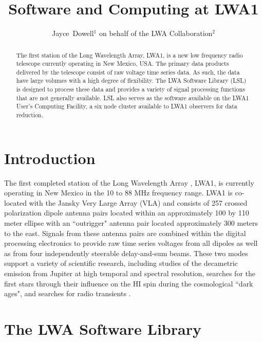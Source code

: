 
\resetcounters




\title{Software and Computing at LWA1}
\author{
Jayce~Dowell$^1$ on behalf of the LWA Collaboration$^2$
}


\begin{abstract}
The first station of the Long Wavelength Array, LWA1, is a new low frequency radio telescope currently operating in New Mexico, USA.  The primary data products delivered by the telescope consist of raw voltage time series data.  As such, the data have large volumes with a high degree of flexibility.  The LWA Software Library (LSL) is designed to process these data and provides a variety of signal processing functions that are not generally available.  LSL also serves as the software available on the LWA1 User's Computing Facility, a six node cluster available to LWA1 observers for data reduction.
\end{abstract}

\section{Introduction}
The first completed station of the Long Wavelength Array \citep[LWA;][]{LWA}, LWA1, is currently operating in New Mexico in the 10 to 88 MHz frequency range.  LWA1 is co-located with the Jansky Very Large Array (VLA) and consists of 257 crossed polarization dipole antenna pairs located within an approximately 100 by 110 meter ellipse with an ``outrigger" antenna pair located approximately 300 meters to the east.  Signals from these antenna pairs are combined within the digital processing electronics to provide raw time series voltages from all dipoles as well as from four independently steerable delay-and-sum beams.  These two modes support a variety of scientific research, including studies of the decametric emission from Jupiter at high temporal and spectral resolution, searches for the first stars through their influence on the HI spin during the cosmological ``dark ages", and searches for radio transients \citep[see][and references therein]{FL}.

\section{The LWA Software Library}
